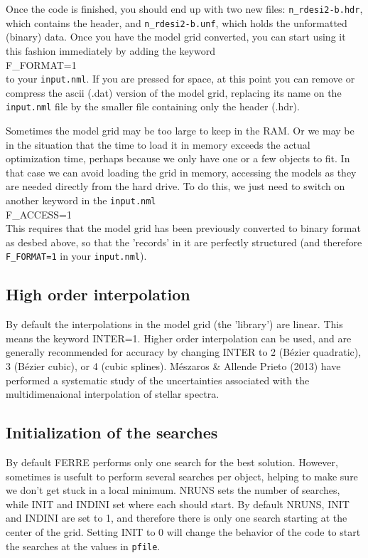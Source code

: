 \documentclass[12pt]{article}
\begin{document}
Once the code is finished, you should end up with two new files: {\tt n\_rdesi2-b.hdr},
which contains the header, and {\tt n\_rdesi2-b.unf}, which holds the unformatted (binary)
data. Once you have the model grid converted, you can start using it this fashion
immediately by adding the keyword \\
F\_FORMAT=1 \\
to your {\tt input.nml}. If you are pressed for space, at this point you can 
remove or compress the ascii (.dat) version of the model grid, replacing its name 
on the {\tt input.nml} file by the smaller file containing only the header (.hdr).

Sometimes the model grid may be too large to keep in the RAM. Or we may be
in the situation that the time to load it in memory exceeds the actual 
optimization time, perhaps because we only have one or a few objects to fit. In that
case we can avoid loading the grid in memory, accessing the models as they are
needed directly from the hard drive. To do this, we just need to switch on another
keyword in the {\tt input.nml} \\
F\_ACCESS=1\\
This requires that the model grid has been previously converted to binary format as desbed above, 
so that the 'records' in it are perfectly structured (and therefore {\tt F\_FORMAT=1} 
in your {\tt input.nml}).

\subsection{High order interpolation}

By default the interpolations in the model grid (the 'library') are linear.
This means the keyword INTER=1. Higher order interpolation can be used, and
are generally recommended for accuracy by changing INTER to 2 (B\'ezier quadratic),
3 (B\'ezier cubic), or 4 (cubic splines). M\'eszaros \& Allende Prieto (2013) have
performed a systematic study of the uncertainties associated with the
multidimenaional interpolation of stellar spectra.

\subsection{Initialization of the searches}
\label{init}

By default FERRE performs only one search for the best solution.
However, sometimes is usefult to perform several searches per object,
helping to make sure we don't get stuck in a local minimum.
NRUNS sets the number of searches, while INIT and INDINI set where each should
start. By default NRUNS, INIT and INDINI are set to 1, and therefore there is
only one search starting at the center of the grid.
Setting INIT to 0 will change the behavior of the code to start the searches
at the values in {\tt pfile}. 
\end{document}
